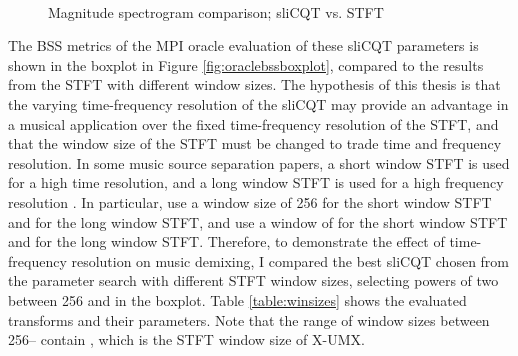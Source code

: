 \documentclass[report.tex]{subfiles}
\begin{document}
\begin{figure}[ht]
	\centering
	\\
	\caption{Magnitude spectrogram comparison; sliCQT vs. STFT}
	\label{fig:bipolarslicqs}
\end{figure}

The BSS metrics of the MPI oracle evaluation of these sliCQT parameters is shown in the boxplot in Figure \ref{fig:oraclebssboxplot}, compared to the results from the STFT with different window sizes. The hypothesis of this thesis is that the varying time-frequency resolution of the sliCQT may provide an advantage in a musical application over the fixed time-frequency resolution of the STFT, and that the window size of the STFT must be changed to trade time and frequency resolution. In some music source separation papers, a short window STFT is used for a high time resolution, and a long window STFT is used for a high frequency resolution \parencite{fitzgerald2, driedger}. In particular, \textcite{driedger} use a window size of 256 for the short window STFT and  for the long window STFT, and \textcite{fitzgerald2} use a window of  for the short window STFT and  for the long window STFT. Therefore, to demonstrate the effect of time-frequency resolution on music demixing, I compared the best sliCQT chosen from the parameter search with different STFT window sizes, selecting powers of two between 256 and  in the boxplot. Table \ref{table:winsizes} shows the evaluated transforms and their parameters. Note that the range of window sizes between 256-- contain , which is the STFT window size of X-UMX.
\end{document}
